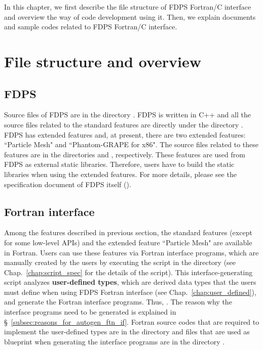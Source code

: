 In this chapter, we first describe the file structure of FDPS Fortran/C interface and overview the way of code development using it. Then, we explain documents and sample codes related to FDPS Fortran/C interface.

\section{File structure and overview}
\subsection{FDPS}
Source files of FDPS are in the directory . FDPS is written in C++ and all the source files related to the standard features are directly under the directory . FDPS has extended features and, at present, there are two extended features: ``Particle Mesh" and ``Phantom-GRAPE for x86". The source files related to these features are in the directories  and , respectively. These features are used from FDPS as external static libraries. Therefore, users have to build the static libraries when using the extended features. For more details, please see the specification document of FDPS itself ().
\subsection{Fortran interface}
\label{subsec:file_str_ftn_if}
Among the features described in previous section, the standard features (except for some low-level APIs) and the extended feature ``Particle Mesh" are available in Fortran. Users can use these features via Fortran interface programs, which are manually created by the users by executing the script  in the directory  (see Chap.~\ref{chap:script_spec} for the details of the script). This interface-generating script analyzes \textbf{user-defined types}, which are derived data types that the users must define when using FDPS Fortran interface (see Chap.~\ref{chap:user_defined}), and generate the Fortran interface programs. Thus, \textbf{}. The reason why the interface programs need to be generated is explained in \S~\ref{subsec:reasons_for_autogen_ftn_if}. Fortran source codes that are required to implement the user-defined types are in the directory  and files that are used as blueprint when generating the interface programs are in the directory .

